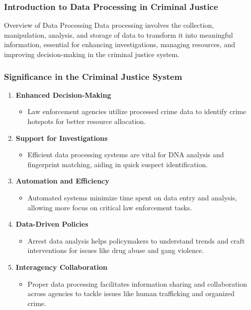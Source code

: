 \documentclass[aspectratio=169]{beamer}
\begin{document}
\frame{\titlepage}

\begin{frame}[fragile]
    \frametitle{Introduction to Data Processing in Criminal Justice}
    \begin{block}{Overview of Data Processing}
        Data processing involves the collection, manipulation, analysis, and storage of data to transform it into meaningful information, essential for enhancing investigations, managing resources, and improving decision-making in the criminal justice system.
    \end{block}
\end{frame}

\begin{frame}[fragile]
    \frametitle{Significance in the Criminal Justice System}
    \begin{enumerate}
        \item \textbf{Enhanced Decision-Making}
        \begin{itemize}
            \item Law enforcement agencies utilize processed crime data to identify crime hotspots for better resource allocation.
        \end{itemize}
        
        \item \textbf{Support for Investigations}
        \begin{itemize}
            \item Efficient data processing systems are vital for DNA analysis and fingerprint matching, aiding in quick suspect identification.
        \end{itemize}
        
        \item \textbf{Automation and Efficiency}
        \begin{itemize}
            \item Automated systems minimize time spent on data entry and analysis, allowing more focus on critical law enforcement tasks.
        \end{itemize}
        
        \item \textbf{Data-Driven Policies}
        \begin{itemize}
            \item Arrest data analysis helps policymakers to understand trends and craft interventions for issues like drug abuse and gang violence.
        \end{itemize}
        
        \item \textbf{Interagency Collaboration}
        \begin{itemize}
            \item Proper data processing facilitates information sharing and collaboration across agencies to tackle issues like human trafficking and organized crime.
        \end{itemize}
    \end{enumerate}
\end{frame}
\end{document}
